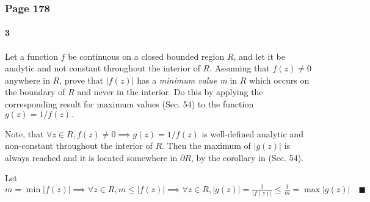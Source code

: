 \documentclass{article}
\begin{document}
\subsubsection*{Page 178}

\paragraph{3} Let a function $f$ be continuous on a closed bounded
region $R$, and let it be analytic and not constant throughout the
interior of $R$. Assuming that $f(z)\neq 0$ anywhere in $R$, prove
that $|f(z)|$ has a\textit{ minimum value m} in $R$ which occurs on
the boundary of $R$ and never in the interior. Do this by applying the
corresponding result for maximum values (Sec. 54) to the function
$g(z) = 1/f(z).$


Note, that $\forall z\in R, f(z)\neq 0 \implies g(z) = 1/f(z)$ is
well-defined analytic and non-constant throughout the interior of
$R$. Then the maximum of $|g(z)|$ is always reached and it is located
somewhere in $\partial R$, by the corollary in (Sec. 54).


Let $m = \min |f(z)| \implies \forall z\in R,  m \leq |f(z)| \implies
\forall z \in R, |g(z)| = \frac{1}{|f(z)|} \leq \frac{1}{m} = \max
|g(z)|\quad \blacksquare$
\end{document}
